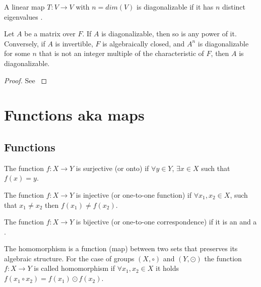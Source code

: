\begin{appendices}
\begin{theorem}
  A linear map $T: V \to V$ with $n = dim(V)$ is diagonalizable if it
  has $n$ distinct eigenvalues \cite{wiki:diagonalizable_matrix}.
  \label{thm:diagonalizable_map_eigenvalues}
\end{theorem}

\begin{theorem}
  Let $A$ be a matrix over $F$. If $A$ is diagonalizable, then so is
  any power of it. Conversely, if $A$ is invertible, $F$ is
  algebraically closed, and $A^n$ is diagonalizable for some $n$ that
  is not an integer multiple of the characteristic of $F$, then $A$ is
  diagonalizable.
  \begin{proof}
    See \cite{wiki:diagonalizable_matrix}
  \end{proof}
  \label{thm:diagonalizable_matrix}
\end{theorem}



\section{Functions aka maps}

\subsection{Functions}

\begin{definition}[Surjection]
  The function $f: X \rightarrow Y$ is surjective (or onto) if
  $\forall y \in Y$, $\exists x \in X$ such that
  $f\left(x\right) = y$.
  \label{def:surjection}
\end{definition}

\begin{definition}[Injection]
  The function $f: X \rightarrow Y$ is injective (or one-to-one function) if
  $\forall x_1, x_2 \in X$, such that $x_1 \ne x_2$ then
  $f\left(x_1\right) \ne f\left(x_2\right)$.
  \label{def:injection}
\end{definition}

\begin{definition}[Bijection]
  The function $f: X \rightarrow Y$ is bijective (or one-to-one
  correspondence) if it is an  and a
  . 
  \label{def:bijection}
\end{definition}

\begin{definition}[Homomorphism]
  The homomorphism is a function (map) between two sets that preserves
  its algebraic structure. For the case of groups
  $\left(X, \circ\right)$ and $\left(Y, \odot\right)$ the function
  $f: X \rightarrow Y$ is called homomorphism if
  $\forall x_1, x_2 \in X$ it holds
  $f\left(x_1 \circ x_2\right) = f\left(x_1 \right) \odot f\left( x_2\right)$.
  \label{def:homomorphism}
\end{definition}


\end{appendices}
